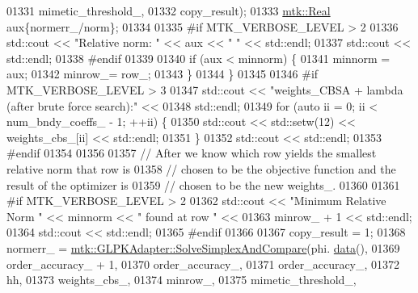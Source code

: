 \begin{DoxyCode}
{{01331                                                           mimetic\_threshold\_,
01332                                                           copy\_result);
01333       \hyperlink{group__c01-roots_gac080bbbf5cbb5502c9f00405f894857d}{mtk::Real} aux\{normerr\_/norm\};
01334 
01335 \textcolor{preprocessor}{      #if MTK\_VERBOSE\_LEVEL > 2}
01336       std::cout << \textcolor{stringliteral}{"Relative norm: "} << aux << \textcolor{stringliteral}{" "} << std::endl;
01337       std::cout << std::endl;
01338 \textcolor{preprocessor}{      #endif}
01339 
01340       \textcolor{keywordflow}{if} (aux < minnorm) \{
01341         minnorm = aux;
01342         minrow\_= row\_;
01343       \}
01344     \}
01345 
01346 \textcolor{preprocessor}{    #if MTK\_VERBOSE\_LEVEL > 3}
01347     std::cout << \textcolor{stringliteral}{"weights\_CBSA + lambda (after brute force search):"} <<
01348       std::endl;
01349     \textcolor{keywordflow}{for} (\textcolor{keyword}{auto} ii = 0; ii < num\_bndy\_coeffs\_ - 1; ++ii) \{
01350       std::cout << std::setw(12) << weights\_cbs\_[ii] << std::endl;
01351     \}
01352     std::cout << std::endl;
01353 \textcolor{preprocessor}{    #endif}
01354 
01356 
01357     \textcolor{comment}{// After we know which row yields the smallest relative norm that row is}
01358     \textcolor{comment}{// chosen to be the objective function and the result of the optimizer is}
01359     \textcolor{comment}{// chosen to be the new weights\_.}
01360 
01361 \textcolor{preprocessor}{    #if MTK\_VERBOSE\_LEVEL > 2}
01362     std::cout << \textcolor{stringliteral}{"Minimum Relative Norm "} << minnorm << \textcolor{stringliteral}{" found at row "} <<
01363       minrow\_ + 1 << std::endl;
01364     std::cout << std::endl;
01365 \textcolor{preprocessor}{    #endif}
01366 
01367     copy\_result = 1;
01368     normerr\_ = \hyperlink{classmtk_1_1GLPKAdapter_a834480aca83e3c0d09fdab7fdb7e8a3f}{mtk::GLPKAdapter::SolveSimplexAndCompare}(phi.
      \hyperlink{classmtk_1_1DenseMatrix_a0c33b8a9e01d157c61ddbdf807c25d84}{data}(),
01369                                                         order\_accuracy\_ + 1,
01370                                                         order\_accuracy\_,
01371                                                         order\_accuracy\_,
01372                                                         hh,
01373                                                         weights\_cbs\_,
01374                                                         minrow\_,
01375                                                         mimetic\_threshold\_,
}}
\end{DoxyCode}

